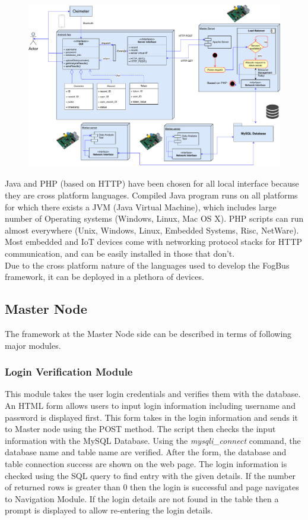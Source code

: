 \documentclass[10pt,journal,compsoc]{IEEEtran}
\begin{document}
\begin{figure}[h]
\centering
\includegraphics[width=\textwidth]{model-with-interface}
\end{figure}

Java and PHP (based on HTTP) have been chosen for all local interface because they are cross platform languages. Compiled Java program runs on all platforms for which there exists a JVM (Java Virtual Machine), which includes large number of Operating systems (Windows, Linux, Mac OS X). PHP scripts can run almost everywhere (Unix, Windows, Linux, Embedded Systems, Risc, NetWare). Most embedded and IoT devices come with networking protocol stacks for HTTP communication, and can be easily installed in those that don't. \\
Due to the cross platform nature of the languages used to develop the FogBus framework, it can be deployed in a plethora of devices.

\subsection{Master Node}

The framework at the Master Node side can be described in terms of following major modules.

\subsubsection{Login Verification Module}
This module takes the user login credentials and verifies them with the database. An HTML form allows users to input login information including username and password is displayed first. This form takes in the login information and sends it to Master node using the POST method. The script then checks the input information with the MySQL Database. Using the \textit{mysqli\_connect} command, the database name and table name are verified. After the form, the database and table connection success are shown on the web page. 
The login information is checked using the SQL query to find entry with the given details. If the number of returned rows is greater than 0 then the login is successful and page navigates to Navigation Module. If the login details are not found in the table then a prompt is displayed to allow re-entering the login details. 
\end{document}
